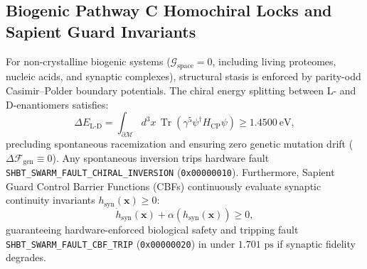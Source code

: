 \documentclass[11pt,onecolumn]{article}
\begin{document}
\subsection{Biogenic Pathway C Homochiral Locks and Sapient Guard Invariants}
For non-crystalline biogenic systems ($\mathcal{G}_{\text{space}} = 0$, including living proteomes, nucleic acids, and synaptic complexes), structural stasis is enforced by parity-odd Casimir--Polder boundary potentials. The chiral energy splitting between L- and D-enantiomers satisfies:
\begin{equation}
\Delta E_{\text{L-D}} = \int_{\partial\mathcal{M}} d^3x \, \operatorname{Tr}\left(\gamma^5 \psi^\dagger H_{\text{CP}} \psi\right) \ge 1.4500~\text{eV},
\label{eq:chiral_splitting_bound}
\end{equation}
precluding spontaneous racemization and ensuring zero genetic mutation drift ($\Delta\mathcal{F}_{\text{gen}} \equiv 0$). Any spontaneous inversion trips hardware fault \\ \texttt{SHBT\_SWARM\_FAULT\_CHIRAL\_INVERSION} (\texttt{0x00000010}). Furthermore, Sapient Guard Control Barrier Functions (CBFs) continuously evaluate synaptic continuity invariants $h_{\text{syn}}(\mathbf{x}) \ge 0$:
\begin{equation}
\dot{h}_{\text{syn}}(\mathbf{x}) + \alpha(h_{\text{syn}}(\mathbf{x})) \ge 0,
\label{eq:sapient_guard_cbf}
\end{equation}
guaranteeing hardware-enforced biological safety and tripping fault \\ \texttt{SHBT\_SWARM\_FAULT\_CBF\_TRIP} (\texttt{0x00000020}) in under $1.701\text{ ps}$ if synaptic fidelity degrades.

\FloatBarrier
\end{document}
